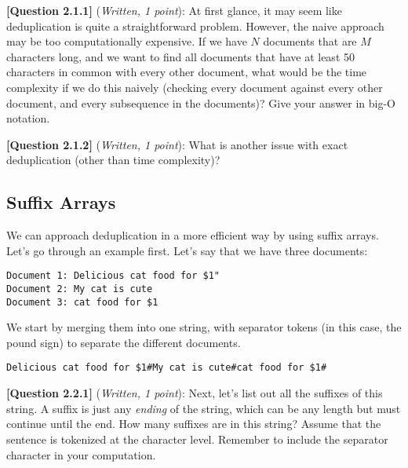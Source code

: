 \documentclass[leqno,12pt]{article}
\begin{document}
\noindent
\noindent \textbf{[Question 2.1.1]} (\emph{Written, 1 point}): At first glance, it may seem like deduplication is quite a straightforward problem. However, the naive approach may be too computationally expensive. If we have $N$ documents that are $M$ characters long, and we want to find all documents that have at least 50 characters in common with every other document, what would be the time complexity if we do this naively (checking every document against every other document, and every subsequence in the documents)? Give your answer in big-O notation. 

\begin{tcolorbox}[fit,height=2cm, width=\linewidth, blank, borderline={1pt}{-2pt}]
\end{tcolorbox}


\noindent \textbf{[Question 2.1.2]} (\emph{Written, 1 point}): What is another issue with exact deduplication (other than time complexity)? 
\begin{tcolorbox}[fit,height=2cm, width=\linewidth, blank, borderline={1pt}{-2pt}]

\end{tcolorbox}

\subsection{Suffix Arrays}
We can approach deduplication in a more efficient way by using suffix arrays. Let's go through an example first. Let's say that we have three documents:
\begin{verbatim}
Document 1: Delicious cat food for $1"
Document 2: My cat is cute
Document 3: cat food for $1
\end{verbatim}

\noindent We start by merging them into one string, with separator tokens (in this case, the pound sign) to separate the different documents. 

\begin{verbatim}
Delicious cat food for $1#My cat is cute#cat food for $1#
\end{verbatim}

\noindent \textbf{[Question 2.2.1]} (\emph{Written, 1 point}): Next, let's list out all the suffixes of this string. A suffix is just any \textit{ending} of the string, which can be any length but must continue until the end. How many suffixes are in this string? Assume that the sentence is tokenized at the character level. Remember to include the separator character in your computation. 
\end{document}
